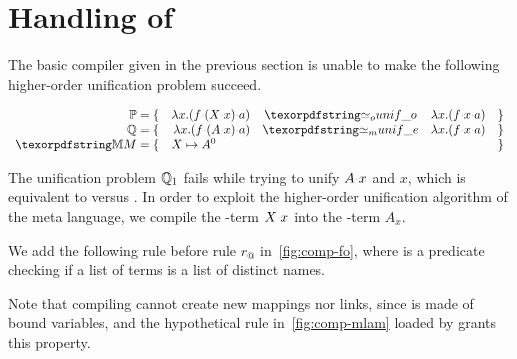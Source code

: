   
\section{Handling of \maybebeta}\label{sec:llam}

The basic compiler given in 
the previous section is unable to make the following
higher-order unification problem succeed.

% 
$$
\begin{array}{rrcll}
\foUnifPb = \{ & \lambda x.(f\appsep (X\appsep x)\appsep a) & \Uo & \lambda x.(f\appsep x\appsep a) & \}\\
\hoUnifPb = \{ & \lambda x.(f\appsep (A\appsep x)\appsep a) & \Ue & \lambda x.(f\appsep x\appsep a) & \}\\
\mapStore = \{ & \multicolumn{3}{l}{X \mapsto A^{0}} & \}\\
\end{array}
$$

The unification problem $\mathbb{Q}_1$ fails while trying to unify
$A \appsep x$ and $x$, which is equivalent to \eI{~\mapp~ [~\muva~ A [], x]}
versus .
In order to exploit the higher-order unification algorithm of the meta language,
we %
compile the \Fo-term $X\appsep x$ into the \Ho-term $A_x$.


We add the following rule before rule $r_@$ in~\cref{fig:comp-fo}, where
 is a predicate checking if a list of
terms is a list of distinct names.




\noindent
Note that compiling  cannot create new mappings nor links, since 
is made of bound variables, and the hypothetical rule 
in~\cref{fig:comp-mlam}
loaded by 
grants this property.

